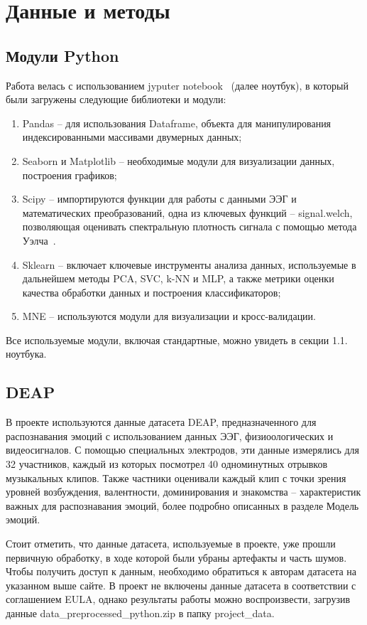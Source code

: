 \documentclass{article}
\begin{document}
\section{Данные и методы}
\subsection{Модули Python}
Работа велась с использованием jyputer notebook~\cite{jyputer} (далее ноутбук), в который были загружены следующие библиотеки и модули:
\begin{enumerate}
\item Pandas -- для использования Dataframe, объекта для манипулирования индексированными массивами двумерных данных;
\item Seaborn и Matplotlib -- необходимые модули для визуализации данных, построения графиков;
\item Scipy -- импортируются функции для работы с данными ЭЭГ и математических преобразований, одна из ключевых функций -- signal.welch, позволяющая оценивать спектральную плотность сигнала с помощью метода Уэлча~\cite{Welch}.
\item Sklearn -- включает ключевые инструменты анализа данных, используемые в дальнейшем методы PCA, SVC, k-NN и MLP, а также метрики оценки качества обработки данных и построения классификаторов;
\item MNE -- используются модули для визуализации и кросс-валидации.
\end{enumerate}
Все используемые модули, включая стандартные, можно увидеть в секции 1.1. ноутбука.

\subsection{DEAP}
В проекте используются данные датасета DEAP, предназначенного для распознавания эмоций с использованием данных ЭЭГ, физиоологических и видеосигналов. С помощью специальных электродов, эти данные измерялись для 32 участников, каждый из которых посмотрел 40 одноминутных отрывков музыкальных клипов. Также частники оценивали каждый клип с точки зрения уровней возбуждения, валентности, доминирования и знакомства -- характеристик важных для распознавания эмоций, более подробно описанных в разделе Модель эмоций.

Стоит отметить, что данные датасета, используемые в проекте, уже прошли первичную обработку, в ходе которой были убраны артефакты и часть шумов. Чтобы получить доступ к данным, необходимо обратиться к авторам датасета на указанном выше сайте. В проект не включены данные датасета в соответствии с соглашением EULA, однако результаты работы можно воспроизвести, загрузив данные data\_preprocessed\_python.zip в папку project\_data.
\end{document}
